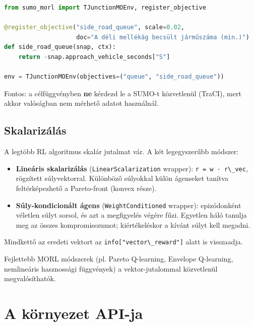 \begin{lstlisting}[language=Python]
from sumo_morl import TJunctionMOEnv, register_objective

@register_objective("side_road_queue", scale=0.02,
                    doc="A déli mellékág becsült járműszáma (min.)")
def side_road_queue(snap, ctx):
    return -snap.approach_vehicle_seconds["S"]

env = TJunctionMOEnv(objectives=("queue", "side_road_queue"))
\end{lstlisting}

Fontos: a célfüggvényben \textbf{ne}
kérdezd le a SUMO-t közvetlenül (TraCI),
mert akkor valóságban nem mérhető adatot
használnál.

\hypertarget{skalarizuxe1luxe1s}{%
\subsection{Skalarizálás}\label{skalarizuxe1luxe1s}}

A legtöbb RL algoritmus skalár jutalmat
vár. A két legegyszerűbb módszer:

\begin{itemize}
\tightlist
\item
  \textbf{Lineáris skalarizálás}
  (\passthrough{\lstinline!LinearScalarization!}
  wrapper):
  \passthrough{\lstinline!r = w · r\_vec!},
  rögzített súlyvektorral. Különböző
  súlyokkal külön ágenseket tanítva
  feltérképezhető a Pareto-front (konvex
  része).
\item
  \textbf{Súly-kondicionált ágens}
  (\passthrough{\lstinline!WeightConditioned!}
  wrapper): epizódonként véletlen súlyt
  sorsol, és azt a megfigyelés végére
  fűzi. Egyetlen háló tanulja meg az
  összes kompromisszumot; kiértékeléskor
  a kívánt súlyt kell megadni.
\end{itemize}

Mindkettő az eredeti vektort az
\passthrough{\lstinline!info["vector\_reward"]!}
alatt is visszaadja.

Fejlettebb MORL módszerek (pl. Pareto
Q-learning, Envelope Q-learning,
nemlineáris hasznossági függvények) a
vektor-jutalommal közvetlenül
megvalósíthatók.


\hypertarget{a-kuxf6rnyezet-api-ja}{%
\section{A környezet
API-ja}\label{a-kuxf6rnyezet-api-ja}}

